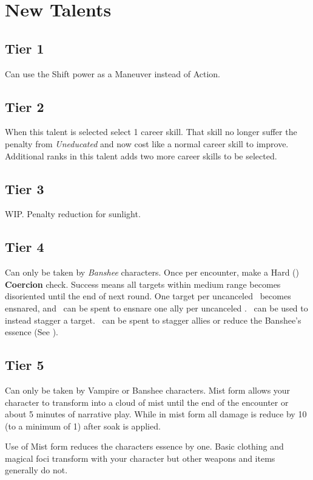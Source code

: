 \documentclass{book}
\begin{document}
\chapter{New Talents}
\begin{multicols}{2}
\section{Tier 1}
 Can use the Shift power as a Maneuver instead of Action.



\section{Tier 2}

 When this talent is selected select 1 career skill. That skill no longer suffer the penalty from \textit{Uneducated} and now cost like a normal career skill to improve. Additional ranks in this talent adds two more career skills to be selected.

\section{Tier 3}
 WIP. Penalty reduction for sunlight.

\section{Tier 4}
 Can only be taken by \textit{Banshee} characters. Once per encounter, make a Hard (\DifficultyDie \DifficultyDie \DifficultyDie) \textbf{Coercion} check. Success means all targets within medium range becomes disoriented until the end of next round. One target per uncanceled \Success\ becomes ensnared, and \Threat\ can be spent to ensnare one ally per uncanceled \Threat. \Triumph\ can be used to instead stagger a target. \Despair\ can be spent to stagger allies or reduce the Banshee's essence (See \pageref{sec:essenceloss}).

\section{Tier 5}
 Can only be taken by Vampire or Banshee characters. Mist form allows your character to transform into a cloud of mist until the end of the encounter or about 5 minutes of narrative play. While in mist form all damage is reduce by 10 (to a minimum of 1) after soak is applied. 

Use of Mist form reduces the characters essence by one. Basic clothing and magical foci transform with your character but other weapons and items generally do not.

\end{multicols}
\end{document}
